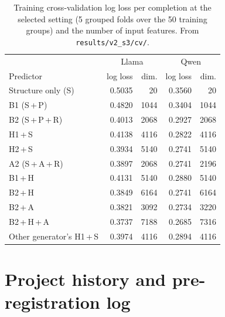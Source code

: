 \documentclass{article}
\begin{document}
\begin{table}[h]
\centering\footnotesize
\caption{Training cross-validation log loss per completion at the selected setting (5 grouped folds over the 50 training groups) and the number of input features. From \texttt{results/v2\_s3/cv/}.}
\label{tab:cv}
\setlength{\tabcolsep}{4pt}
\begin{tabular}{lrrrr}
\toprule
 & \multicolumn{2}{c}{Llama} & \multicolumn{2}{c}{Qwen} \\
Predictor & log loss & dim. & log loss & dim. \\
\midrule
Structure only (S) & 0.5035 & 20 & 0.3560 & 20 \\
\midrule
B1 (S\,+\,P) & 0.4820 & 1044 & 0.3404 & 1044 \\
B2 (S\,+\,P\,+\,R) & 0.4013 & 2068 & 0.2927 & 2068 \\
H1\,+\,S & 0.4138 & 4116 & 0.2822 & 4116 \\
H2\,+\,S & 0.3934 & 5140 & 0.2741 & 5140 \\
A2 (S\,+\,A\,+\,R) & 0.3897 & 2068 & 0.2741 & 2196 \\
\midrule
B1\,+\,H & 0.4131 & 5140 & 0.2880 & 5140 \\
B2\,+\,H & 0.3849 & 6164 & 0.2741 & 6164 \\
B2\,+\,A & 0.3821 & 3092 & 0.2734 & 3220 \\
B2\,+\,H\,+\,A & 0.3737 & 7188 & 0.2685 & 7316 \\
Other generator's H1\,+\,S & 0.3974 & 4116 & 0.2894 & 4116 \\
\bottomrule
\end{tabular}
\end{table}

\section{Project history and pre-registration log}
\label{app:history}
\end{document}
